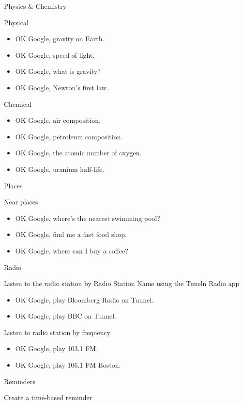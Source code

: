 \documentclass[
  a4paper,
]{article}
\begin{document}
Physics \& Chemistry

Physical

\begin{itemize}
\item
  OK Google, gravity on Earth.
\item
  OK Google, speed of light.
\item
  OK Google, what is gravity?
\item
  OK Google, Newton's first law.
\end{itemize}

Chemical

\begin{itemize}
\item
  OK Google, air composition.
\item
  OK Google, petroleum composition.
\item
  OK Google, the atomic number of oxygen.
\item
  OK Google, uranium half-life.
\end{itemize}

Places

Near places

\begin{itemize}
\item
  OK Google, where's the nearest swimming pool?
\item
  OK Google, find me a fast food shop.
\item
  OK Google, where can I buy a coffee?
\end{itemize}

Radio

Listen to the radio station by Radio Station Name using the Tuneln Radio
app

\begin{itemize}
\item
  OK Google, play Bloomberg Radio on Tunnel.
\item
  OK Google, play BBC on Tunnel.
\end{itemize}

Listen to radio station by frequency

\begin{itemize}
\item
  OK Google, play 103.1 FM.
\item
  OK Google, play 106.1 FM Boston.
\end{itemize}

Reminders

Create a time-based reminder
\end{document}
